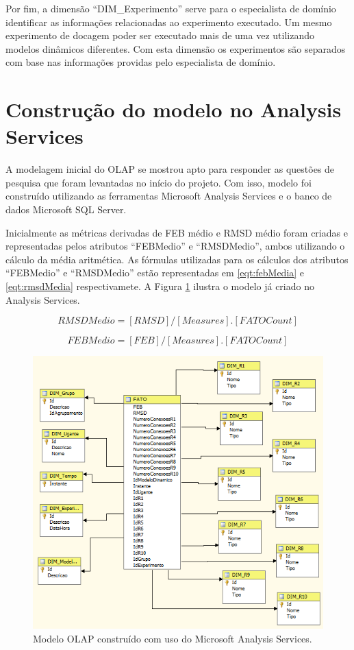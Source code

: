 Por fim, a dimensão ``DIM\_Experimento'' serve para o especialista de domínio identificar as informações relacionadas ao experimento executado. Um mesmo experimento de docagem poder ser executado mais de uma vez utilizando modelos dinâmicos diferentes. Com esta dimensão os experimentos são separados com base nas informações providas pelo especialista de domínio.


\section{Construção do modelo no Analysis Services}

A modelagem inicial do OLAP se mostrou apto para responder as questões de pesquisa que foram levantadas no início do projeto. Com isso, modelo foi construído utilizando as ferramentas Microsoft Analysis Services e o banco de dados Microsoft SQL Server. 

Inicialmente as métricas derivadas de FEB médio e RMSD médio foram criadas e representadas pelos atributos ``FEBMedio'' e ``RMSDMedio'', ambos utilizando o cálculo da média aritmética. As fórmulas utilizadas para os cálculos dos atributos ``FEBMedio'' e ``RMSDMedio'' estão representadas em \ref{eqt:febMedia} e \ref{eqt:rmsdMedia} respectivamete. A Figura \ref{fig:ModeloOLAP} ilustra o modelo já criado no Analysis Services.

\begin{equation}
\label{eqt:febMedia}
        RMSDMedio = [RMSD]/[Measures].[FATO Count]
\end{equation}

\begin{equation}
\label{eqt:rmsdMedia}
        FEBMedio = [FEB]/[Measures].[FATO Count]
\end{equation}

\begin{figure}[h]
        \center
        \includegraphics[scale=1]{images/ModelagemOLAP.PNG}
        \caption{Modelo OLAP construído com uso do Microsoft Analysis Services.}
        \label{fig:ModeloOLAP}
\end{figure}

